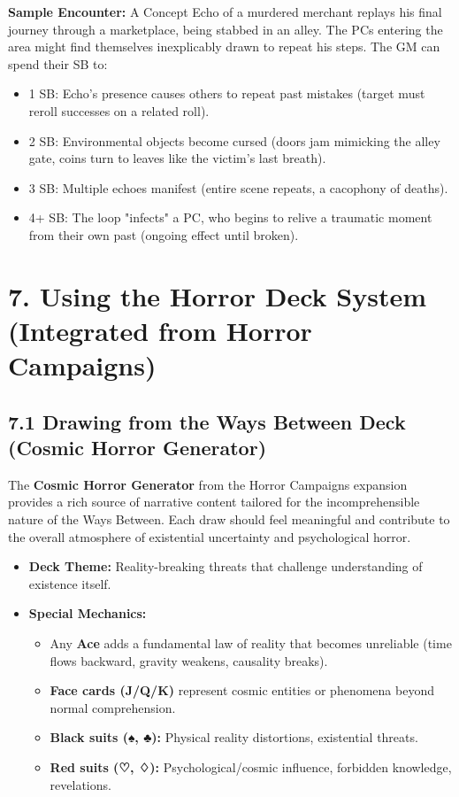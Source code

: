 \documentclass[11pt]{article}
\begin{document}
\textbf{Sample Encounter:} A Concept Echo of a murdered merchant replays his final journey through a marketplace, being stabbed in an alley. The PCs entering the area might find themselves inexplicably drawn to repeat his steps. The GM can spend their SB to:
\begin{itemize}
\item 1 SB: Echo's presence causes others to repeat past mistakes (target must reroll successes on a related roll).
\item 2 SB: Environmental objects become cursed (doors jam mimicking the alley gate, coins turn to leaves like the victim's last breath).
\item 3 SB: Multiple echoes manifest (entire scene repeats, a cacophony of deaths).
\item 4+ SB: The loop "infects" a PC, who begins to relive a traumatic moment from their own past (ongoing effect until broken).
\end{itemize}

\clearpage

\section*{7. Using the Horror Deck System (Integrated from Horror Campaigns)}

\subsection*{7.1 Drawing from the Ways Between Deck (Cosmic Horror Generator)}

The \textbf{Cosmic Horror Generator} from the Horror Campaigns expansion provides a rich source of narrative content tailored for the incomprehensible nature of the Ways Between. Each draw should feel meaningful and contribute to the overall atmosphere of existential uncertainty and psychological horror.

\begin{itemize}
\item \textbf{Deck Theme:} Reality-breaking threats that challenge understanding of existence itself.
\item \textbf{Special Mechanics:}
\begin{itemize}
\item Any \textbf{Ace} adds a fundamental law of reality that becomes unreliable (time flows backward, gravity weakens, causality breaks).
\item \textbf{Face cards (J/Q/K)} represent cosmic entities or phenomena beyond normal comprehension.
\item \textbf{Black suits (♠, ♣):} Physical reality distortions, existential threats.
\item \textbf{Red suits (♡, ♢):} Psychological/cosmic influence, forbidden knowledge, revelations.
\end{itemize}
\end{itemize}
\end{document}
